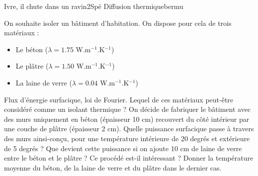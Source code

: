 \begin{exercise}{Ivre, il chute dans un ravin}{2}{Spé}
{Diffusion thermique}{bermu}

On souhaite isoler un bâtiment d'habitation. On dispose pour cela de trois matériaux :
\begin{itemize}
    \item Le béton ($\lambda = 1.75$ W.m$^{-1}$.K$^{-1}$)
    \item Le plâtre ($\lambda = 1.50$ W.m$^{-1}$.K$^{-1}$)
    \item La laine de verre ($\lambda = 0.04$ W.m$^{-1}$.K$^{-1}$)
\end{itemize}

\begin{questions}
    \questioncours Flux d'énergie surfacique, loi de Fourier.
    \question Lequel de ces matériaux peut-être considéré comme un isolant thermique ?
    \question On décide de fabriquer le bâtiment avec des murs uniquement en béton (épaisseur 10 cm) recouvert du côté intérieur par une couche de plâtre (épaisseur 2 cm). Quelle puissance surfacique passe à travers des murs ainsi-conçu, pour une température intérieure de 20 degrés et extérieure de 5 degrés ?
    \question Que devient cette puissance si on ajoute 10 cm de laine de verre entre le béton et le plâtre ? Ce procédé est-il intéressant ?
    \question Donner la température moyenne du béton, de la laine de verre et du plâtre dans le dernier cas. 
\end{questions}

\end{exercise}
